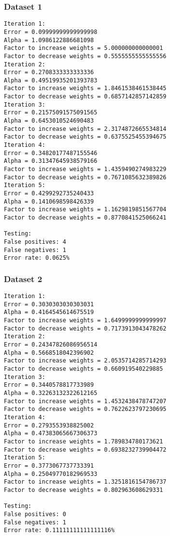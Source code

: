 \documentclass[12pt]{article}
\begin{document}
\subsubsection{Dataset 1}

\begin{verbatim}
Iteration 1:
Error = 0.09999999999999998
Alpha = 1.0986122886681098
Factor to increase weights = 5.000000000000001
Factor to decrease weights = 0.5555555555555556
Iteration 2:
Error = 0.2708333333333336
Alpha = 0.49519935201393783
Factor to increase weights = 1.8461538461538445
Factor to decrease weights = 0.6857142857142859
Iteration 3:
Error = 0.21575091575091565
Alpha = 0.6453010524690483
Factor to increase weights = 2.3174872665534814
Factor to decrease weights = 0.6375525455394675
Iteration 4:
Error = 0.34820177487155546
Alpha = 0.31347645938579166
Factor to increase weights = 1.4359490274983229
Factor to decrease weights = 0.7671085632389826
Iteration 5:
Error = 0.4299292735240433
Alpha = 0.1410698598426339
Factor to increase weights = 1.1629819851567704
Factor to decrease weights = 0.8770841525066241

Testing: 
False positives: 4
False negatives: 1
Error rate: 0.0625%
\end{verbatim}

\subsubsection{Dataset 2}

\begin{verbatim}
Iteration 1:
Error = 0.3030303030303031
Alpha = 0.4164545614675519
Factor to increase weights = 1.6499999999999997
Factor to decrease weights = 0.7173913043478262
Iteration 2:
Error = 0.24347826086956514
Alpha = 0.5668518042396902
Factor to increase weights = 2.0535714285714293
Factor to decrease weights = 0.660919540229885
Iteration 3:
Error = 0.3440578817733989
Alpha = 0.32263132322612165
Factor to increase weights = 1.4532438478747207
Factor to decrease weights = 0.7622623797230695
Iteration 4:
Error = 0.2793553938825002
Alpha = 0.47383065667306373
Factor to increase weights = 1.789834780173621
Factor to decrease weights = 0.6938232739904472
Iteration 5:
Error = 0.3773067737733391
Alpha = 0.25049770182969533
Factor to increase weights = 1.3251816154786737
Factor to decrease weights = 0.802963608629331

Testing: 
False positives: 0
False negatives: 1
Error rate: 0.11111111111111116%
\end{verbatim}
\end{document}
